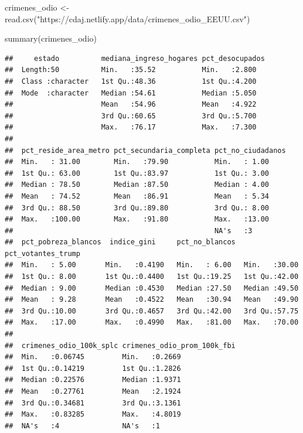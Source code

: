 \documentclass[
]{book}
\newenvironment{Shaded}{\begin{snugshade}}{\end{snugshade}}
\newcommand{\FunctionTok}[1]{\textcolor[rgb]{0.00,0.00,0.00}{#1}}
\newcommand{\NormalTok}[1]{#1}
\newcommand{\OtherTok}[1]{\textcolor[rgb]{0.56,0.35,0.01}{#1}}
\newcommand{\StringTok}[1]{\textcolor[rgb]{0.31,0.60,0.02}{#1}}
\begin{document}
\begin{Shaded}
\begin{Highlighting}[]
\NormalTok{crimenes\_odio }\OtherTok{\textless{}{-}} \FunctionTok{read.csv}\NormalTok{(}\StringTok{"https://cdaj.netlify.app/data/crimenes\_odio\_EEUU.csv"}\NormalTok{)}

\FunctionTok{summary}\NormalTok{(crimenes\_odio)}
\end{Highlighting}
\end{Shaded}

\begin{verbatim}
##     estado          mediana_ingreso_hogares pct_desocupados
##  Length:50          Min.   :35.52           Min.   :2.800  
##  Class :character   1st Qu.:48.36           1st Qu.:4.200  
##  Mode  :character   Median :54.61           Median :5.050  
##                     Mean   :54.96           Mean   :4.922  
##                     3rd Qu.:60.65           3rd Qu.:5.700  
##                     Max.   :76.17           Max.   :7.300  
##                                                            
##  pct_reside_area_metro pct_secundaria_completa pct_no_ciudadanos
##  Min.   : 31.00        Min.   :79.90           Min.   : 1.00    
##  1st Qu.: 63.00        1st Qu.:83.97           1st Qu.: 3.00    
##  Median : 78.50        Median :87.50           Median : 4.00    
##  Mean   : 74.52        Mean   :86.91           Mean   : 5.34    
##  3rd Qu.: 88.50        3rd Qu.:89.80           3rd Qu.: 8.00    
##  Max.   :100.00        Max.   :91.80           Max.   :13.00    
##                                                NA's   :3        
##  pct_pobreza_blancos  indice_gini     pct_no_blancos  pct_votantes_trump
##  Min.   : 5.00       Min.   :0.4190   Min.   : 6.00   Min.   :30.00     
##  1st Qu.: 8.00       1st Qu.:0.4400   1st Qu.:19.25   1st Qu.:42.00     
##  Median : 9.00       Median :0.4530   Median :27.50   Median :49.50     
##  Mean   : 9.28       Mean   :0.4522   Mean   :30.94   Mean   :49.90     
##  3rd Qu.:10.00       3rd Qu.:0.4657   3rd Qu.:42.00   3rd Qu.:57.75     
##  Max.   :17.00       Max.   :0.4990   Max.   :81.00   Max.   :70.00     
##                                                                         
##  crimenes_odio_100k_splc crimenes_odio_prom_100k_fbi
##  Min.   :0.06745         Min.   :0.2669             
##  1st Qu.:0.14219         1st Qu.:1.2826             
##  Median :0.22576         Median :1.9371             
##  Mean   :0.27761         Mean   :2.1924             
##  3rd Qu.:0.34681         3rd Qu.:3.1361             
##  Max.   :0.83285         Max.   :4.8019             
##  NA's   :4               NA's   :1
\end{verbatim}
\end{document}
